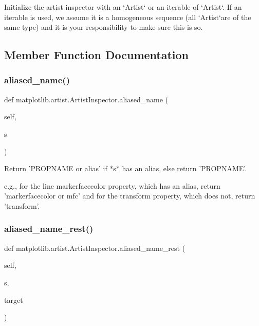 \begin{DoxyVerb}Initialize the artist inspector with an `Artist` or an iterable of
`Artist`\s.  If an iterable is used, we assume it is a homogeneous
sequence (all `Artist`\s are of the same type) and it is your
responsibility to make sure this is so.
\end{DoxyVerb}
 

\subsection{Member Function Documentation}
\mbox{\label{classmatplotlib_1_1artist_1_1ArtistInspector_abe46d203d92aa084cebb9322b58e8538}} 
\subsubsection{\texorpdfstring{aliased\+\_\+name()}{aliased\_name()}}
{\footnotesize\ttfamily def matplotlib.\+artist.\+Artist\+Inspector.\+aliased\+\_\+name (\begin{DoxyParamCaption}\item[{}]{self,  }\item[{}]{s }\end{DoxyParamCaption})}

\begin{DoxyVerb}Return 'PROPNAME or alias' if *s* has an alias, else return 'PROPNAME'.

e.g., for the line markerfacecolor property, which has an
alias, return 'markerfacecolor or mfc' and for the transform
property, which does not, return 'transform'.
\end{DoxyVerb}
 \mbox{\label{classmatplotlib_1_1artist_1_1ArtistInspector_ab6a0ede430ff36c1a7dc291b20f0e5df}} 
\subsubsection{\texorpdfstring{aliased\+\_\+name\+\_\+rest()}{aliased\_name\_rest()}}
{\footnotesize\ttfamily def matplotlib.\+artist.\+Artist\+Inspector.\+aliased\+\_\+name\+\_\+rest (\begin{DoxyParamCaption}\item[{}]{self,  }\item[{}]{s,  }\item[{}]{target }\end{DoxyParamCaption})}

